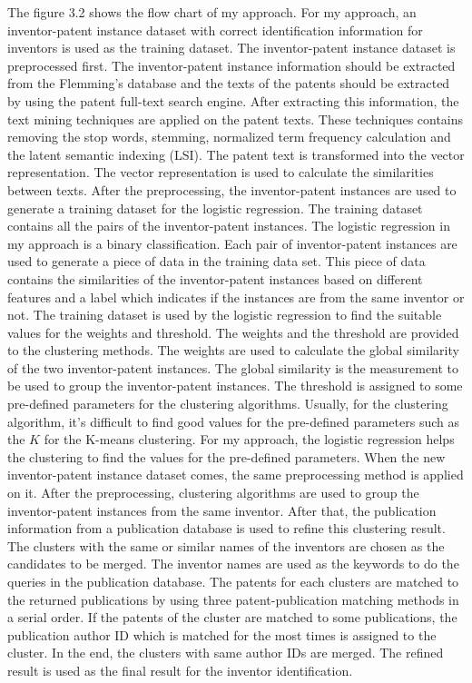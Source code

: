 The figure 3.2 shows the flow chart of my approach. For my approach, an inventor-patent instance dataset with correct identification information for inventors is used as the training dataset. The inventor-patent instance dataset is preprocessed first. The inventor-patent instance information should be extracted from the Flemming's database and the texts of the patents should be extracted by using the patent full-text search engine. After extracting this information, the text mining techniques are applied on the patent texts. These techniques contains removing the stop words, stemming, normalized term frequency calculation and the latent semantic indexing (LSI). The patent text is transformed into the vector representation. The vector representation is used to calculate the similarities between texts. After the preprocessing, the inventor-patent instances are used to generate a training dataset for the logistic regression. The training dataset contains all the pairs of the inventor-patent instances. The logistic regression in my approach is a binary classification. Each pair of inventor-patent instances are used to generate a piece of data in the training data set. This piece of data contains the similarities of the inventor-patent instances based on different features and a label which indicates if the instances are from the same inventor or not. The training dataset is used by the logistic regression to find the suitable values for the weights and threshold. The weights and the threshold are provided to the clustering methods. The weights are used to calculate the global similarity of the two inventor-patent instances.  The global similarity is the measurement to be used to group the inventor-patent instances. The threshold is assigned to some pre-defined parameters  for the clustering algorithms. Usually, for the clustering algorithm, it's difficult to find good values for the pre-defined parameters such as the $K$ for the K-means clustering. For my approach, the logistic regression  helps the clustering to find the values for the pre-defined parameters. When the new inventor-patent instance dataset comes, the same preprocessing method is  applied on it. After the preprocessing,  clustering algorithms are used to group the inventor-patent instances from the same inventor. After that, the publication information from a publication database is used to refine this clustering result. The clusters with the same or similar names of the inventors are chosen as the candidates to be merged. The inventor names are used as the keywords to do the queries in the publication database. The patents for each clusters are matched to the returned publications  by using  three patent-publication matching methods in a serial order. If the patents of the cluster are matched to some  publications, the publication author ID which is matched for the most times is assigned to the cluster. In the end, the clusters with same author IDs are merged. The refined result is used as the final result for the inventor identification.

\newpage
\thispagestyle{empty}
\rule{0cm}{5cm}